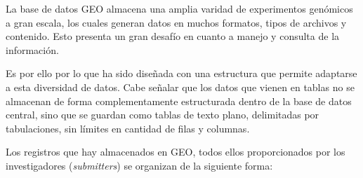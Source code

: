 
La base de datos GEO almacena una amplia varidad de experimentos genómicos a gran escala, los cuales generan datos en muchos formatos, tipos de archivos
y contenido. Esto presenta un gran desafío en cuanto a manejo y consulta de la información. \newline

Es por ello por lo que ha sido diseñada con una estructura que permite adaptarse a esta diversidad de datos. Cabe señalar que los datos que vienen en tablas
no se almacenan de forma complementamente estructurada dentro de la base de datos central, sino que se guardan como tablas de texto plano, delimitadas por
tabulaciones, sin límites en cantidad de filas y columnas. \newline

Los registros que hay almacenados en GEO, todos ellos proporcionados por los investigadores (\textit{submitters}) se organizan de la siguiente forma:

